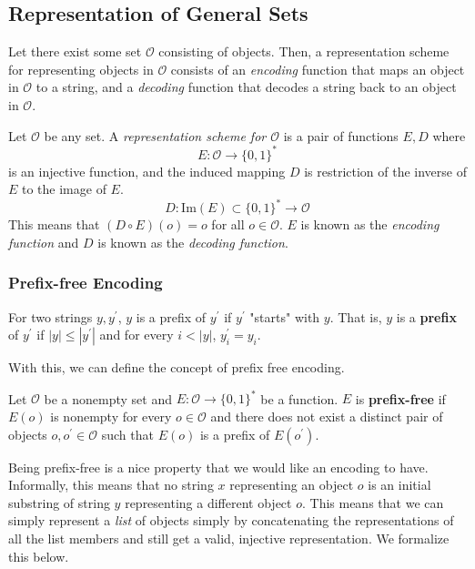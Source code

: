 \documentclass{article}
\begin{document}
  \subsection{Representation of General Sets}
  Let there exist some set $\mathcal{O}$ consisting of objects. Then, a representation scheme for representing objects in $\mathcal{O}$ consists of an \textit{encoding} function that maps an object in $\mathcal{O}$ to a string, and a \textit{decoding} function that decodes a string back to an object in $\mathcal{O}$. 

  \begin{definition}
  Let $\mathcal{O}$ be any set. A \textit{representation scheme for $\mathcal{O}$} is a pair of functions $E, D$ where 
  \[E: \mathcal{O} \longrightarrow \{0,1\}^*\]
  is an injective function, and the induced mapping $D$ is restriction of the inverse of $E$ to the image of $E$. 
  \[D: \mathrm{Im}(E) \subset \{0,1\}^* \longrightarrow \mathcal{O}\]
  This means that $(D \circ E) (o) = o$ for all $o \in \mathcal{O}$. $E$ is known as the \textit{encoding function} and $D$ is known as the \textit{decoding function}. 
  \end{definition}

  \subsubsection{Prefix-free Encoding}
  \begin{definition}[Prefix]
  For two strings $y, y^\prime$, $y$ is a prefix of $y^\prime$ if $y^\prime$ "starts" with $y$. That is, $y$ is a \textbf{prefix} of $y^\prime$ if $|y| \leq |y^\prime|$ and for every $i<|y|$, $y_i^\prime = y_i$. 
  \end{definition}

  With this, we can define the concept of prefix free encoding. 

  \begin{definition}
  Let $\mathcal{O}$ be a nonempty set and $E: \mathcal{O} \longrightarrow \{0,1\}^*$ be a function. $E$ is \textbf{prefix-free} if $E(o)$ is nonempty for every $o \in \mathcal{O}$ and there does not exist a distinct pair of objects $o, o^\prime \in \mathcal{O}$ such that $E(o)$ is a prefix of $E(o^\prime)$. 
  \end{definition}

  Being prefix-free is a nice property that we would like an encoding to have. Informally, this means that no string $x$ representing an object $o$ is an initial substring of string $y$ representing a different object $o$. This means that we can simply represent a \textit{list} of objects simply by concatenating the representations of all the list members and still get a valid, injective representation. We formalize this below.
\end{document}
